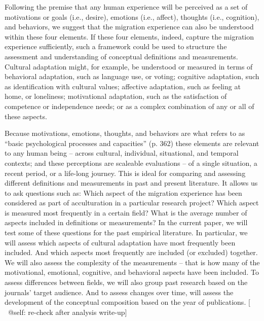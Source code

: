 \documentclass[man, 12pt, a4paper]{apa7}
\newcommand\Warning[1][2ex]{%
  \renewcommand\stacktype{L}%
  \scaleto{\stackon[1.3pt]{\color{red}$\triangle$}{\tiny\bfseries !}}{#1}}%
\begin{document}
Following the premise that any human experience will be perceived as a set of motivations or goals (i.e., desire), emotions (i.e., affect), thoughts (i.e., cognition), and behaviors, we suggest that the migration experience can also be understood within these four elements. If these four elements, indeed, capture the migration experience sufficiently, such a framework could be used to structure the assessment and understanding of conceptual definitions and measurements. Cultural adaptation might, for example, be understood or measured in terms of behavioral adaptation, such as language use, or voting; cognitive adaptation, such as identification with cultural values; affective adaptation, such as feeling at home, or loneliness; motivational adaptation, such as the satisfaction of competence or independence needs; or as a complex combination of any or all of these aspects. 

Because motivations, emotions, thoughts, and behaviors are what \citet{Berry2009a} refers to as ``basic psychological processes and capacities'' (p. 362) these elements are relevant to any human being -- across cultural, individual, situational, and temporal contexts; and these perceptions are scaleable evaluations -- of a single situation, a recent period, or a life-long journey. This is ideal for comparing and assessing different definitions and measurements in past and present literature. It allows us to ask questions such as: Which aspect of the migration experience has been considered as part of acculturation in a particular research project? Which aspect is measured most frequently in a certain field? What is the average number of aspects included in definitions or measurements? 
In the current paper, we will test some of these questions for the past empirical literature. In particular, we will assess which aspects of cultural adaptation have most frequently been included. And which aspects most frequently are included (or excluded) together. We will also assess the complexity of the measurements -- that is how many of the motivational, emotional, cognitive, and behavioral aspects have been included. To assess differences between fields, we will also group past research based on the journals' target audience. And to assess changes over time, will assess the development of the conceptual composition based on the year of publications. [\Warning\ @self: re-check after analysis write-up]
\end{document}
